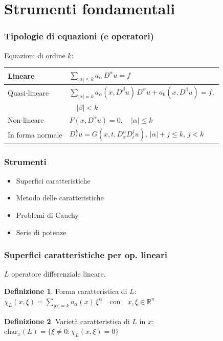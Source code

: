 \documentclass[serif,notheorems]{beamer}
\theoremstyle{definition} %
\newtheorem{definition}{Definizione}[section] %
\theoremstyle{remark}
\begin{document}
\section{Strumenti fondamentali}

\begin{frame}
\frametitle{Tipologie di equazioni (e operatori)}
Equazioni di ordine $k$: 
\begin{table}
\renewcommand{\arraystretch}{2}
\begin{tabular}{l l} 
\hline \hline
 Lineare & $\sum_{|\alpha |\leq k} a_\alpha \, D^\alpha u = f$ \\
 \hline
 \vspace{-2mm}
 Quasi-lineare & $\sum_{|\alpha |= k} a_\alpha (x,D^\beta u) \, D^\alpha u +  a_0(x,D^\beta u)= f,$\\
 & $\quad |\beta |<k $ \\
 \hline
 Non-lineare & $F(x,D^\alpha u)=0, \quad |\alpha | \leq k$ \\
 \hline
 In forma normale & $D_{t}^k u = G(x,t, D^\alpha_x D^j_t u), \, |\alpha |+j \leq k, \, j < k$ \\
 \hline \hline
\end{tabular}
\end{table}
\end{frame}

\begin{frame}
\frametitle{Strumenti}
\begin{itemize}
\item Superfici caratteristiche
\item Metodo delle caratteristiche
\item Problemi di Cauchy
\item Serie di potenze
\end{itemize}

\end{frame}

\begin{frame}
\frametitle{Superfici caratteristiche per op. lineari}
$L$ operatore differenziale lineare.
\begin{definition}
Forma caratteristica di $L$:\\ $\chi_L(x,\xi)=\sum\limits_{|\alpha |= k} a_\alpha(x) \, \xi^\alpha \quad \text{con} \quad x,\xi \in \mathbb{R}^n$
\end{definition}

\begin{definition}
Varietà caratteristica di $L$ in $x$:\\ $\text{char}_x (L)= \{ \xi \neq 0 : \chi_L(x,\xi)=0 \}$
\end{definition}
\end{frame}
\end{document}

